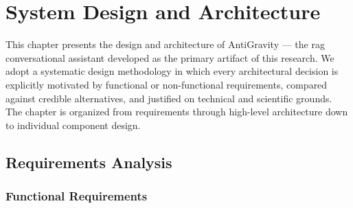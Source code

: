 \chapter{System Design and Architecture}
\label{chap:architecture}

This chapter presents the design and architecture of AntiGravity --- the \gls{rag} conversational assistant developed as the primary artifact of this research. We adopt a systematic design methodology in which every architectural decision is explicitly motivated by functional or non-functional requirements, compared against credible alternatives, and justified on technical and scientific grounds. The chapter is organized from requirements through high-level architecture down to individual component design.

\section{Requirements Analysis}
\label{sec:arch-requirements}

\subsection{Functional Requirements}

